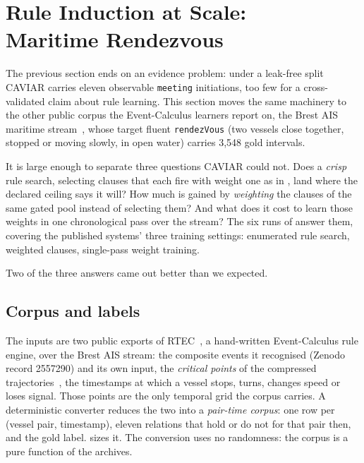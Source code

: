 \section{Rule Induction at Scale:\texorpdfstring{\\}{ }Maritime Rendezvous}\label{sec:maritime}

The previous section ends on an evidence problem: under a leak-free split CAVIAR carries eleven observable \texttt{meeting} initiations, too few for a cross-validated claim about rule learning. This section moves the same machinery to the other public corpus the Event-Calculus learners report on, the Brest AIS maritime stream~\cite{brestais,maritimecer}, whose target fluent \texttt{rendezVous} (two vessels close together, stopped or moving slowly, in open water) carries 3{,}548 gold intervals.

It is large enough to separate three questions CAVIAR could not. Does a \emph{crisp} rule search, selecting clauses that each fire with weight one as in , land where the declared ceiling says it will? How much is gained by \emph{weighting} the clauses of the same gated pool instead of selecting them? And what does it cost to learn those weights in one chronological pass over the stream? The six runs of  answer them, covering the published systems' three training settings: enumerated rule search, weighted clauses, single-pass weight training.

Two of the three answers came out better than we expected.

\subsection{Corpus and labels}

The inputs are two public exports of RTEC~\cite{rtec}, a hand-written Event-Calculus rule engine, over the Brest AIS stream: the composite events it recognised (Zenodo record 2557290) and its own input, the \emph{critical points} of the compressed trajectories~\cite{maritimecer}, the timestamps at which a vessel stops, turns, changes speed or loses signal. Those points are the only temporal grid the corpus carries. A deterministic converter reduces the two into a \emph{pair-time corpus}: one row per (vessel pair, timestamp), eleven relations that hold or do not for that pair then, and the gold label.  sizes it. The conversion uses no randomness: the corpus is a pure function of the archives.

